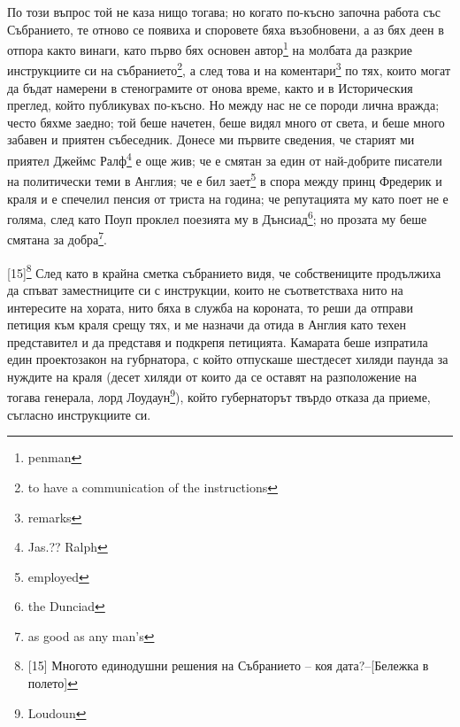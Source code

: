 \documentclass[12pt]{book}
\begin{document}
По този въпрос той не каза нищо тогава; но когато по-късно започна работа със Събранието, те отново се появиха и споровете бяха възобновени, а аз бях деен в отпора както винаги, като първо бях основен автор\footnote{penman} на молбата да разкрие инструкциите си на събранието\footnote{to have a communication of the instructions}, а след това и на коментари\footnote{remarks} по тях, които могат да бъдат намерени в стенограмите от онова време, както и в Историческия преглед, който публикувах по-късно. Но между нас не се породи лична вражда; често бяхме заедно; той беше начетен, беше видял много от света, и беше много забавен и приятен събеседник. Донесе ми първите сведения, че старият ми приятел Джеймс Ралф\footnote{Jas.?? Ralph} е още жив; че е смятан за един от най-добрите писатели на политически теми в Англия; че е бил зает\footnote{employed} в спора между принц Фредерик и краля и е спечелил пенсия от триста на година; че репутацията му като поет не е голяма, след като Поуп проклел поезията му в Дънсиад\footnote{the Dunciad}; но прозата му беше смятана за добра\footnote{as good as any man's}. 


[15]\footnote{[15] Многото единодушни решения на Събранието -- коя дата?--[Бележка в полето]} След като в крайна сметка събранието видя, че собствениците продължиха да спъват заместниците си с инструкции, които не съответстваха нито на интересите на хората, нито бяха в служба на короната, то реши да отправи петиция към краля срещу тях, и ме назначи да отида в Англия като техен представител и да представя и подкрепя петицията. Камарата беше изпратила един проектозакон на губрнатора, с който отпускаше шестдесет хиляди паунда за нуждите на краля (десет хиляди от които да се оставят на разположение на тогава генерала, лорд Лоудаун\footnote{Loudoun}), който губернаторът твърдо отказа да приеме, съгласно инструкциите си. 
\end{document}
